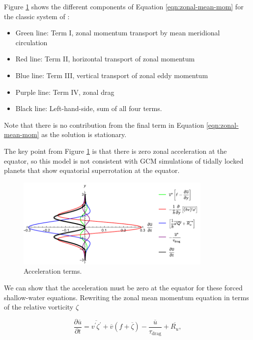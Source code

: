 Figure \ref{fig:matsuno-zonal-acceleration-terms} shows the different components of Equation \ref{eqn:zonal-mean-mom} for the classic system of \citet{matsuno1966quasi}:

\begin{itemize}
  \item Green line: Term I, zonal momentum transport by mean meridional circulation
  \item Red line: Term II, horizontal transport of zonal momentum
  \item Blue line: Term III, vertical transport of zonal eddy momentum
  \item Purple line: Term IV, zonal drag
  \item Black line: Left-hand-side, sum of all four terms.
\end{itemize}

Note that there is no contribution from the final term in Equation \ref{eqn:zonal-mean-mom} as the solution is stationary.

The key point from Figure \ref{fig:matsuno-zonal-acceleration-terms} is that there is zero zonal acceleration at the equator, so this model is not consistent with GCM simulations of tidally locked planets that show equatorial superrotation at the equator.

\begin{figure}
  \centering
  \includegraphics[width=0.85\textwidth]{figures/wave-mean-flow/matsuno-zonal-acceleration-terms.pdf}
  \caption{Acceleration terms.}
  \label{fig:matsuno-zonal-acceleration-terms}
\end{figure}


We can show that the acceleration must be zero at the equator for these forced shallow-water equations. Rewriting the zonal mean momentum equation in terms of the relative vorticity $\zeta$ \citep{thuburn1999zonalmean} \citep{showman2011superrotation}

\begin{equation}
  \frac { \partial \overline { u } } { \partial t } = \overline { v ^ { \prime } \zeta ^ { \prime } } + \overline { v } ( f + \overline { \zeta } ) - \frac { \overline { u } } { \tau _ { \mathrm { drag } } } + \overline { R _ { u } },
\end{equation}


